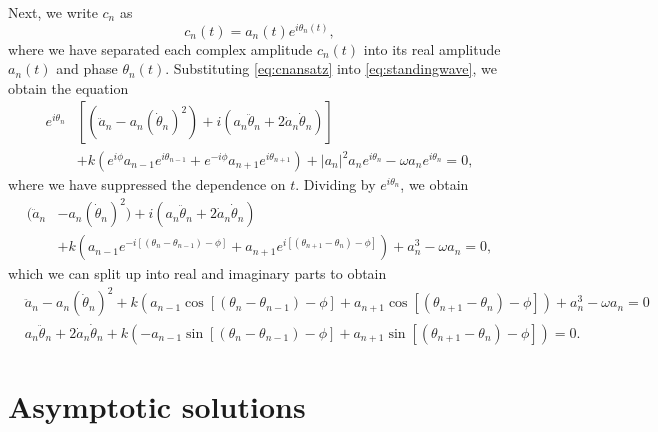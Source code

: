 \documentclass[11pt,reqno]{amsart}
\begin{document}
Next, we write $c_n$ as
\begin{equation}\label{eq:cnansatz}
c_n(t) = a_n(t)e^{i \theta_n(t)},
\end{equation}
where we have separated each complex amplitude $c_n(t)$ into its real amplitude $a_n(t)$ and phase $\theta_n(t)$. Substituting \cref{eq:cnansatz} into \cref{eq:standingwave}, we obtain the equation
\begin{align*}
e^{i \theta_n}&\left[ (\ddot a_n - a_n (\dot \theta_n)^2) 
+ i ( a_n \ddot\theta_n + 2 \dot a_n \dot \theta_n ) \right] \\
&+ k\left(e^{i\phi}a_{n-1}e^{i \theta_{n-1}} +e^{-i\phi}a_{n+1}e^{i \theta_{n+1}}\right)+|a_n|^2 a_n e^{i \theta_n} - \omega a_n e^{i \theta_n} = 0,
\end{align*}
where we have suppressed the dependence on $t$. Dividing by $e^{i \theta_n}$, we obtain
\begin{equation}\label{eq:st2}
\begin{aligned}
(\ddot a_n &- a_n (\dot \theta_n)^2) 
+ i ( a_n \ddot\theta_n + 2 \dot a_n \dot \theta_n )\\
&+ k\left(a_{n-1}e^{-i[(\theta_n - \theta_{n-1}) - \phi]} + a_{n+1}e^{i[(\theta_{n+1} - \theta_{n}) - \phi]} \right)+a_n^3 - \omega a_n = 0,
\end{aligned}
\end{equation}  
which we can split up into real and imaginary parts to obtain
\begin{align}
&\ddot a_n - a_n (\dot \theta_n)^2 +
 k\left(a_{n-1}\cos[(\theta_n - \theta_{n-1}) - \phi] + a_{n+1}\cos[(\theta_{n+1} - \theta_{n}) - \phi] \right)+a_n^3 - \omega a_n = 0 \label{eq:st2real} \\
&a_n \ddot\theta_n + 2 \dot a_n \dot \theta_n
+ k\left(-a_{n-1}\sin[(\theta_n - \theta_{n-1}) - \phi] + a_{n+1}\sin [(\theta_{n+1} - \theta_{n}) - \phi] \right) = 0. \label{eq:st2imag}
\end{align}

\section{Asymptotic solutions}\label{sec:asymp}
\end{document}
